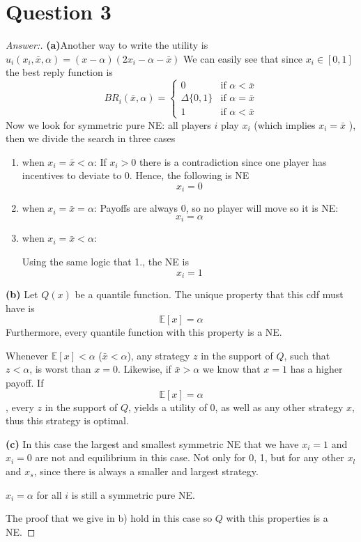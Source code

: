 \documentclass{article}
\theoremstyle{definition}
\begin{document}
\section*{Question 3}
\begin{proof}[Answer:]
\textbf{(a)}Another way to write the utility is 
$u_i(x_i, \bar{x},\alpha)=(x-\alpha)(2 x_i - \alpha -\bar{x}) $
We can easily see that since $x_i \in [0,1]$ the best reply function is
\begin{equation}
BR_i(\bar{x}, \alpha) =\begin{cases} 
      0 & \text{if } \alpha < \bar{x}  \\
      \Delta\{0,1\} &  \text{if }\alpha = \bar{x} \\
      1 &  \text{if } \alpha < \bar{x}  
   \end{cases}
\end{equation}
Now we look for symmetric pure NE: all players $i$ play $x_i$ (which implies  $x_i= \bar{x}$ ), then we divide the search in three cases
\begin{enumerate}
    \item when $x_i = \bar{x} < \alpha$:
If $x_i>0$ there is a contradiction since one player has incentives to deviate to 0. Hence, the following is NE
$$x_i= 0$$ 
      \item when $x_i = \bar{x} = \alpha$: 
      Payoffs are always 0, so no player will move so it is NE: $$x_i  = \alpha$$
      
        \item when $x_i = \bar{x} < \alpha$:
        
        Using the same logic that 1., the NE is $$x_i = 1$$
        \end{enumerate}
\textbf{(b)} Let $Q(x)$ be a quantile function. The unique property that this cdf must have is
$$\mathbb{E}[x] = \alpha$$
Furthermore, every quantile function with this property is a NE.

Whenever $\mathbb{E}[x] < \alpha$ ($\bar{x}<\alpha$), any strategy $z$ in the support of $Q$, such that  $z<\alpha$, is worst than $x = 0$. Likewise, if $\bar{x}>\alpha$ we know that $x = 1$ has a higher payoff. If $$\mathbb{E}[x] = \alpha$$, every $z$ in the support of $Q$, yields a utility of 0, as well as any other strategy $x$, thus this strategy is optimal.

\textbf{(c)} In this case the largest and smallest  symmetric NE  that we have $x_i = 1$ and $x_i = 0$ are not and equilibrium in this case. Not only for 0, 1, but for any other $x_l$ and $x_s$, since there is always a smaller and largest strategy. 

$x_i = \alpha $ for all $i$ is still a symmetric pure NE.

The proof that we give in b) hold in this case so $Q$ with this properties is a NE.
\end{proof}
\end{document}
